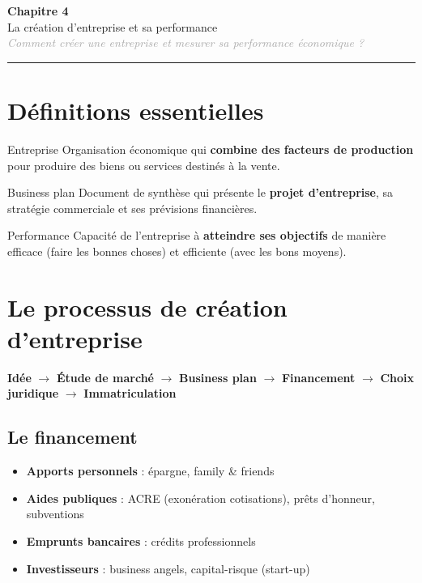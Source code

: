 \documentclass[11pt,a4paper]{article}
\begin{document}
\begin{center}
  {\Large\bfseries\textcolor{mainColor}{Chapitre 4}}\\[2pt]
  {\large La création d'entreprise et sa performance}\\[4pt]
  \textit{\textcolor{darkGray}{Comment créer une entreprise et mesurer sa performance économique ?}}
\end{center}
\vspace{4pt}\hrule\vspace{8pt}

\section*{Définitions essentielles}

\begin{defbox}{Entreprise}
Organisation économique qui \textbf{combine des facteurs de production} pour produire des biens ou services destinés à la vente.
\end{defbox}

\vspace{4pt}
\begin{defbox}{Business plan}
Document de synthèse qui présente le \textbf{projet d'entreprise}, sa stratégie commerciale et ses prévisions financières.
\end{defbox}

\vspace{4pt}
\begin{defbox}{Performance}
Capacité de l'entreprise à \textbf{atteindre ses objectifs} de manière efficace (faire les bonnes choses) et efficiente (avec les bons moyens).
\end{defbox}

\section*{Le processus de création d'entreprise}

\begin{center}
\textbf{Idée} $\rightarrow$ \textbf{Étude de marché} $\rightarrow$ \textbf{Business plan} $\rightarrow$ \textbf{Financement} $\rightarrow$ \textbf{Choix juridique} $\rightarrow$ \textbf{Immatriculation}
\end{center}

\subsection*{Le financement}
\begin{itemize}
  \item \textbf{Apports personnels} : épargne, family \& friends
  \item \textbf{Aides publiques} : ACRE (exonération cotisations), prêts d'honneur, subventions
  \item \textbf{Emprunts bancaires} : crédits professionnels
  \item \textbf{Investisseurs} : business angels, capital-risque (start-up)
\end{itemize}
\end{document}
